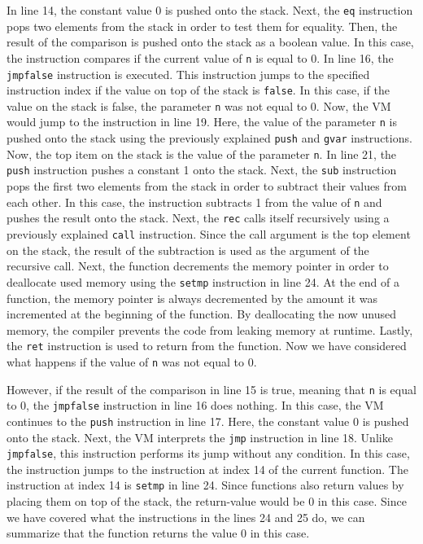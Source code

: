 In line 14, the constant value 0 is pushed onto the stack.
Next, the \texttt{eq} instruction pops two elements from the stack in order to test them for equality.
Then, the result of the comparison is pushed onto the stack as a boolean value.
In this case, the instruction compares if the current value of \texttt{n} is equal to 0.
In line 16, the \texttt{jmpfalse} instruction is executed.
This instruction jumps to the specified instruction index if the value on top of the stack is \texttt{false}.
In this case, if the value on the stack is false, the parameter \texttt{n} was not equal to 0.
Now, the VM would jump to the instruction in line 19.
Here, the value of the parameter \texttt{n} is pushed onto the stack using the previously explained \texttt{push} and \texttt{gvar} instructions.
Now, the top item on the stack is the value of the parameter \texttt{n}.
In line 21, the \texttt{push} instruction pushes a constant 1 onto the stack.
Next, the \texttt{sub} instruction pops the first two elements from the stack in order to subtract their values from each other.
In this case, the instruction subtracts 1 from the value of \texttt{n} and pushes the result onto the stack.
Next, the \texttt{rec} calls itself recursively using a previously explained \texttt{call} instruction.
Since the call argument is the top element on the stack, the result of the subtraction is used as the argument of the recursive call.
Next, the function decrements the memory pointer in order to deallocate used memory using the \texttt{setmp} instruction in line 24.
At the end of a function, the memory pointer is always decremented by the amount it was incremented at the beginning of the function.
By deallocating the now unused memory, the compiler prevents the code from leaking memory at runtime.
Lastly, the \texttt{ret} instruction is used to return from the function.
Now we have considered what happens if the value of \texttt{n} was not equal to 0.

However, if the result of the comparison in line 15 is true, meaning that \texttt{n} is equal to 0, the \texttt{jmpfalse} instruction in line 16 does nothing.
In this case, the VM continues to the \texttt{push} instruction in line 17.
Here, the constant value 0 is pushed onto the stack.
Next, the VM interprets the \texttt{jmp} instruction in line 18.
Unlike \texttt{jmpfalse}, this instruction performs its jump without any condition.
In this case, the instruction jumps to the instruction at index 14 of the current function.
The instruction at index 14 is \texttt{setmp} in line 24.
Since functions also return values by placing them on top of the stack, the return-value would be 0 in this case.
Since we have covered what the instructions in the lines 24 and 25 do, we can summarize that the function returns the value 0 in this case.

